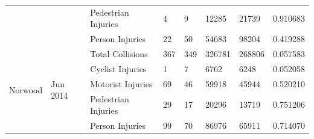 \documentclass[10pt,journal,compsoc]{IEEEtran}
\begin{document}
\begin{table}[]
\begin{tabular}{|l|l|l|l|l|l|l|l|}
                                               &                             & Pedestrian Injuries & 4         & 9        & 12285      & 21739     & 0.910683 \\ \cline{3-8} 
                                               &                             & Person Injuries     & 22        & 50       & 54683      & 98204     & 0.419288 \\ \hline
\multirow{5}{*}{Norwood}                       & \multirow{5}{*}{Jun 2014} & Total Collisions    & 367       & 349      & 326781     & 268806    & 0.057583 \\ \cline{3-8} 
                                               &                             & Cyclist Injuries    & 1         & 7        & 6762       & 6248      & 0.052058 \\ \cline{3-8} 
                                               &                             & Motorist Injuries   & 69        & 46       & 59918      & 45944     & 0.520210 \\ \cline{3-8} 
                                               &                             & Pedestrian Injuries & 29        & 17       & 20296      & 13719     & 0.751206 \\ \cline{3-8} 
                                               &                             & Person Injuries     & 99        & 70       & 86976      & 65911     & 0.714070 \\ \hline
\end{tabular}
\end{table}
\end{document}
